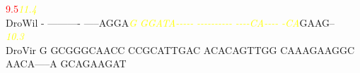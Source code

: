 \documentclass[11pt,twoside,reqno,a4paper]{article}
\begin{document}
{\hspace*{7\charwidth}\hspace*{0\charwidth}\textcolor{Red}{9.5}\hspace*{1\charwidth}\hspace*{1\charwidth}\hspace*{1\charwidth}\hspace*{27\charwidth}\textit{\textcolor{Yellow}{11.4}}\hspace*{1\charwidth}\hspace*{1\charwidth}\hspace*{1\charwidth}\\
DroWil	-	----------	-----AGGA\textit{\textcolor{Yellow}{G}}	\textit{\textcolor{Yellow}{G}}\textit{\textcolor{Yellow}{G}}\textit{\textcolor{Yellow}{A}}\textit{\textcolor{Yellow}{T}}\textit{\textcolor{Yellow}{A}}\textit{\textcolor{Yellow}{-}}\textit{\textcolor{Yellow}{-}}\textit{\textcolor{Yellow}{-}}\textit{\textcolor{Yellow}{-}}\textit{\textcolor{Yellow}{-}}	\textit{\textcolor{Yellow}{-}}\textit{\textcolor{Yellow}{-}}\textit{\textcolor{Yellow}{-}}\textit{\textcolor{Yellow}{-}}\textit{\textcolor{Yellow}{-}}\textit{\textcolor{Yellow}{-}}\textit{\textcolor{Yellow}{-}}\textit{\textcolor{Yellow}{-}}\textit{\textcolor{Yellow}{-}}\textit{\textcolor{Yellow}{-}}	\textit{\textcolor{Yellow}{-}}\textit{\textcolor{Yellow}{-}}\textit{\textcolor{Yellow}{-}}\textit{\textcolor{Yellow}{-}}\textit{\textcolor{Yellow}{C}}\textit{\textcolor{Yellow}{A}}\textit{\textcolor{Yellow}{-}}\textit{\textcolor{Yellow}{-}}\textit{\textcolor{Yellow}{-}}\textit{\textcolor{Yellow}{-}}	\textit{\textcolor{Yellow}{-}}\textit{\textcolor{Yellow}{C}}\textit{\textcolor{Yellow}{A}}GAAG--\\
\hspace*{7\charwidth}\hspace*{1\charwidth}\hspace*{1\charwidth}\hspace*{20\charwidth}\textit{\textcolor{Yellow}{10.3}}\hspace*{1\charwidth}\hspace*{1\charwidth}\hspace*{1\charwidth}\hspace*{1\charwidth}\\
DroVir	G	GCGGGCAACC	CCGCATTGAC	ACACAGTTGG	CAAAGAAGGC	AACA-----A	GCAGAAGAT\\
\hspace*{7\charwidth}\hspace*{1\charwidth}\hspace*{1\charwidth}\hspace*{1\charwidth}\hspace*{1\charwidth}\hspace*{1\charwidth}\hspace*{1\charwidth}\\
}
\end{document}
